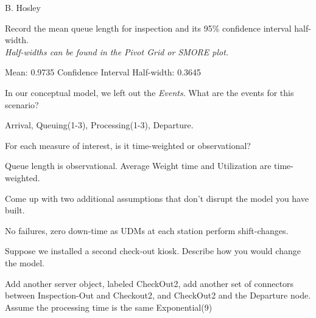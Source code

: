 \documentclass[answers]{exam}
\begin{document}
\hspace{\fill} {\large B. Hosley}
\bigskip

\begin{questions}

\question 
Record the mean queue length for inspection and its 95\% confidence interval half-width. \\
\hspace{3em} \textit{Half-widths can be found in the Pivot Grid or SMORE plot.}
\begin{solution}
	Mean: 0.9735
	Confidence Interval Half-width: 0.3645
\end{solution}

\question 
In our conceptual model, we left out the \textit{Events}. What are the events for this scenario?
\begin{solution}
	Arrival, Queuing(1-3), Processing(1-3), Departure.
\end{solution}

\question 
For each measure of interest, is it time-weighted or observational?
\begin{solution}
	Queue length is observational.
	Average Weight time and Utilization are time-weighted.
\end{solution}

\question 
Come up with two additional assumptions that don’t disrupt the model you have built.
\begin{solution}
	No failures, zero down-time as UDMs at each station perform shift-changes.
\end{solution}

\question 
Suppose we installed a second check-out kiosk. Describe how you would change the model.
\begin{solution}
	Add another server object, labeled CheckOut2, 
	add another set of connectors between Inspection-Out and Checkout2,
	and CheckOut2 and the Departure node.
	Assume the processing time is the same Exponential(9)
\end{solution}


\end{questions}
\end{document}
